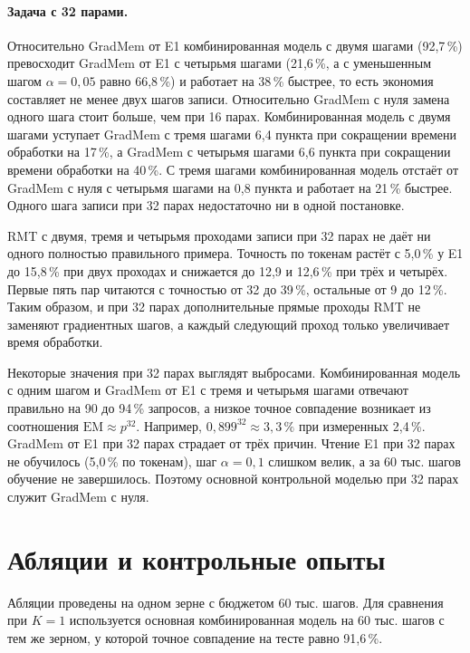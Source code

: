\documentclass[a4paper,11pt]{article}
\begin{document}
\paragraph{Задача с 32 парами.} Относительно GradMem от E1 комбинированная модель с двумя шагами (92,7\,\%) превосходит GradMem от E1 с четырьмя шагами (21,6\,\%, а с уменьшенным шагом $\alpha=0{,}05$ равно 66,8\,\%) и работает на 38\,\% быстрее, то есть экономия составляет не менее двух шагов записи. Относительно GradMem с нуля замена одного шага стоит больше, чем при 16 парах. Комбинированная модель с двумя шагами уступает GradMem с тремя шагами 6,4 пункта при сокращении времени обработки на 17\,\%, а GradMem с четырьмя шагами 6,6 пункта при сокращении времени обработки на 40\,\%. С тремя шагами комбинированная модель отстаёт от GradMem с нуля с четырьмя шагами на 0,8 пункта и работает на 21\,\% быстрее. Одного шага записи при 32 парах недостаточно ни в одной постановке.

RMT с двумя, тремя и четырьмя проходами записи при 32 парах не даёт ни одного полностью правильного примера. Точность по токенам растёт с 5,0\,\% у E1 до 15,8\,\% при двух проходах и снижается до 12,9 и 12,6\,\% при трёх и четырёх. Первые пять пар читаются с точностью от 32 до 39\,\%, остальные от 9 до 12\,\%. Таким образом, и при 32 парах дополнительные прямые проходы RMT не заменяют градиентных шагов, а каждый следующий проход только увеличивает время обработки.

Некоторые значения при 32 парах выглядят выбросами. Комбинированная модель с одним шагом и GradMem от E1 с тремя и четырьмя шагами отвечают правильно на 90 до 94\,\% запросов, а низкое точное совпадение возникает из соотношения $\mathrm{EM}\approx p^{32}$. Например, $0{,}899^{32}\approx 3{,}3\,\%$ при измеренных 2,4\,\%. GradMem от E1 при 32 парах страдает от трёх причин. Чтение E1 при 32 парах не обучилось (5,0\,\% по токенам), шаг $\alpha=0{,}1$ слишком велик, а за 60 тыс. шагов обучение не завершилось. Поэтому основной контрольной моделью при 32 парах служит GradMem с нуля.

\section{Абляции и контрольные опыты}
Абляции проведены на одном зерне с бюджетом 60 тыс. шагов. Для сравнения при $K=1$ используется основная комбинированная модель на 60 тыс. шагов с тем же зерном, у которой точное совпадение на тесте равно 91,6\,\%.
\end{document}
